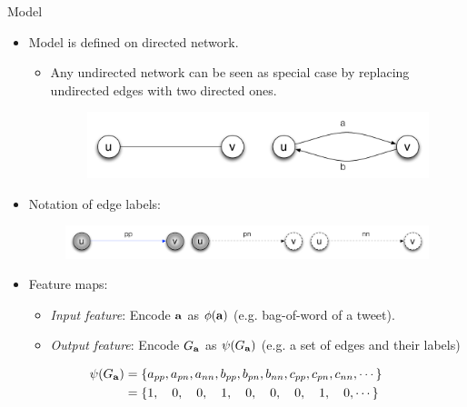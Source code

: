 \documentclass[first=dgreen,second=purple,logo=yellowexc]{aaltoslides}
\newcommand{\ab}{{\bf a}}
\newcommand{\pp}{\sc{pp}}
\newcommand{\pn}{\sc{pn}}
\newcommand{\nn}{\sc{nn}}
\begin{document}
\begin{frame}{Model}
	\begin{itemize}
		\item Model is defined on directed network.
		\begin{itemize}
			\item Any undirected network can be seen as special case by replacing undirected edges with two directed ones.
			\begin{figure}
				\center
				\includegraphics[scale=0.2]{./plots/model_definition.pdf}
			\end{figure}
		\end{itemize}
		\item Notation of edge labels:
		\begin{figure}
			\center
			\includegraphics[scale=0.2]{./plots/notations.pdf}
		\end{figure}
		\item Feature maps:
		\begin{itemize}
			\item {\it Input feature}: Encode $\ab$ as $\phi(\ab)$ (e.g. bag-of-word of a tweet).
			\item {\it Output feature}: Encode $G_{\ab}$ as $\psi(G_{\ab})$ (e.g. a set of edges and their labels)
		\end{itemize}
	\end{itemize}
		\vspace{-6mm}
	\begin{multicols}{2}
	{\scriptsize
		\begin{align*}
			\psi(G_{\ab}) 
			&= \{a_{\pp},a_{\pn},a_{\nn},b_{\pp},b_{\pn},b_{\nn},c_{\pp},c_{\pn},c_{\nn},\cdots\}\\
			&= \{1,\quad 0,\quad 0,\quad 1,\quad 0,\quad 0,\quad 0,\quad 1,\quad 0,\cdots\}
		\end{align*}}


\end{multicols}
\end{frame}
\end{document}
